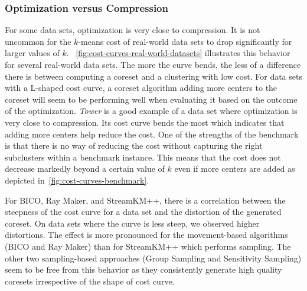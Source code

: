 \subsubsection*{Optimization versus Compression}
For some data sets, optimization is very close to compression. It is not uncommon for the $k$-means cost of real-world data sets to drop significantly for larger values of $k$.
~\cref{fig:cost-curves-real-world-datasets} illustrates this behavior for several real-world data sets. The more the curve bends, the less of a difference there is between computing a coreset and a clustering with low cost. For data sets with a L-shaped cost curve, a coreset algorithm adding more centers to the coreset will seem to be performing well when evaluating it based on the outcome of the optimization.
\textit{Tower} is a good example of a data set where optimization is very close to compression. Its cost curve bends the most which indicates that adding more centers help reduce the cost. One of the strengths of the benchmark is that there is no way of reducing the cost without capturing the right subclusters within a benchmark instance. This means that the cost does not decrease markedly beyond a certain value of $k$ even if more centers are added as depicted in~\cref{fig:cost-curves-benchmark}. 

For BICO, Ray Maker, and StreamKM++, there is a correlation between the steepness of the cost curve for a data set and the distortion of the generated coreset. 
On data sets where the curve is less steep, we observed higher distortions. The effect is more pronounced for the movement-based algorithms (BICO and Ray Maker) than for StreamKM++ which performs sampling. The other two sampling-based approaches (Group Sampling and Sensitivity Sampling) seem to be free from this behavior as they consistently generate high quality coresets irrespective of the shape of cost curve.







